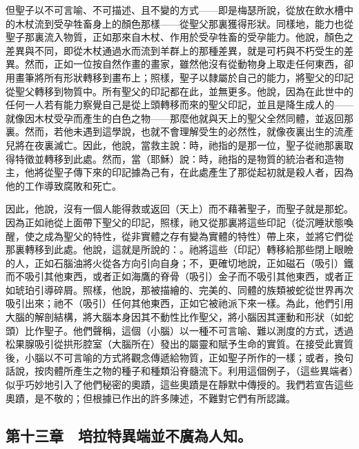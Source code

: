 但聖子以不可言喻、不可描述、且不變的方式——即是梅瑟所說，從放在飲水槽中的木杖流到受孕牲畜身上的顏色那樣——從聖父那裏獲得形狀。同樣地，能力也從聖子那裏流入物質，正如那來自木杖、作用於受孕牲畜的受孕能力。他說，顏色之差異與不同，即從木杖通過水而流到羊群上的那種差異，就是可朽與不朽受生的差異。然而，正如一位按自然作畫的畫家，雖然他沒有從動物身上取走任何東西，卻用畫筆將所有形狀轉移到畫布上；照樣，聖子以隸屬於自己的能力，將聖父的印記從聖父轉移到物質中。所有聖父的印記都在此，並無更多。他說，因為在此世中的任何一人若有能力察覺自己是從上頭轉移而來的聖父印記，並且是降生成人的——就像因木杖受孕而產生的白色之物——那麼他就與天上的聖父全然同體，並返回那裏。然而，若他未遇到這學說，也就不會理解受生的必然性，就像夜裏出生的流產兒將在夜裏滅亡。因此，他說，當救主說：時，祂指的是那一位，聖子從祂那裏取得特徵並轉移到此處。然而，當（耶穌）說：時，祂指的是物質的統治者和造物主，他將從聖子傳下來的印記據為己有，在此處產生了那從起初就是殺人者，因為他的工作導致腐敗和死亡。\par

因此，他說，沒有一個人能得救或返回（天上）而不藉著聖子，而聖子就是那蛇。因為正如祂從上面帶下聖父的印記，照樣，祂又從那裏將這些印記（從沉睡狀態喚醒，使之成為聖父的特性，從非實體之存有變為實體的特性）帶上來，並將它們從那裏轉移到此處。他說，這就是所說的：。祂將這些（印記）轉移給那些閉上眼瞼的人，正如石腦油將火從各方向引向自身；不，更確切地說，正如磁石（吸引）鐵而不吸引其他東西，或者正如海鷹的脊骨（吸引）金子而不吸引其他東西，或者正如琥珀引導碎屑。照樣，他說，那被描繪的、完美的、同體的族類被蛇從世界再次吸引出來；祂不（吸引）任何其他東西，正如它被祂派下來一樣。為此，他們引用大腦的解剖結構，將大腦本身因其不動性比作聖父，將小腦因其運動和形狀（如蛇頭）比作聖子。他們聲稱，這個（小腦）以一種不可言喻、難以測度的方式，透過松果腺吸引從拱形腔室（大腦所在）發出的屬靈和賦予生命的實質。在接受此實質後，小腦以不可言喻的方式將觀念傳遞給物質，正如聖子所作的一樣；或者，換句話說，按肉體所產生之物的種子和種類沿脊髓流下。利用這個例子，（這些異端者）似乎巧妙地引入了他們秘密的奧蹟，這些奧蹟是在靜默中傳授的。我們若宣告這些奧蹟，是不敬的；但根據已作出的許多陳述，不難對它們有所認識。\par


\subsection{第十三章　培拉特異端並不廣為人知。}

